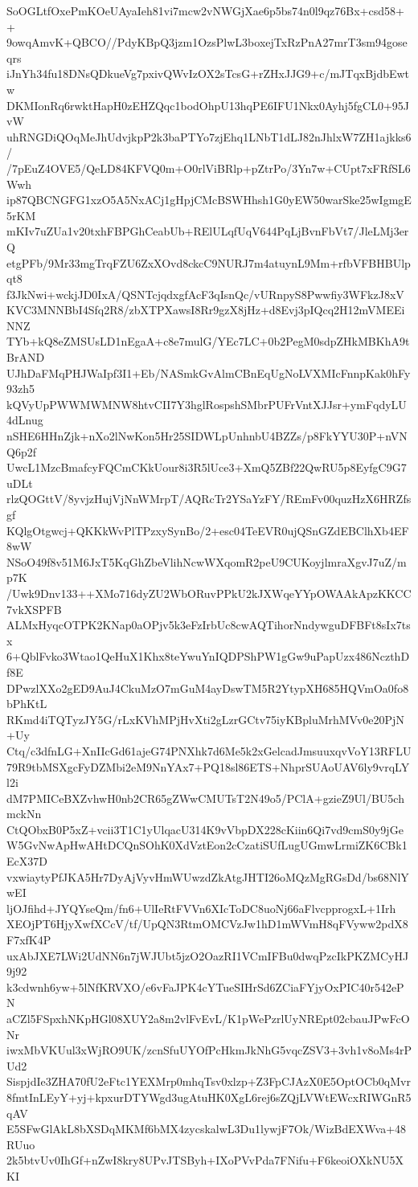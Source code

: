 SoOGLtfOxePmKOeUAyaIeh81vi7mcw2vNWGjXae6p5bs74n0l9qz76Bx+csd58++
9owqAmvK+QBCO//PdyKBpQ3jzm1OzsPlwL3boxejTxRzPnA27mrT3sm94goseqrs
iJnYh34fu18DNsQDkueVg7pxivQWvIzOX2sTcsG+rZHxJJG9+c/mJTqxBjdbEwtw
DKMIonRq6rwktHapH0zEHZQqc1bodOhpU13hqPE6IFU1Nkx0Ayhj5fgCL0+95JvW
uhRNGDiQOqMeJhUdvjkpP2k3baPTYo7zjEhq1LNbT1dLJ82nJhlxW7ZH1ajkks6/
/7pEuZ4OVE5/QeLD84KFVQ0m+O0rlViBRlp+pZtrPo/3Yn7w+CUpt7xFRfSL6Wwh
ip87QBCNGFG1xzO5A5NxACj1gHpjCMcBSWHhsh1G0yEW50warSke25wIgmgE5rKM
mKIv7uZUa1v20txhFBPGhCeabUb+RElULqfUqV644PqLjBvnFbVt7/JleLMj3erQ
etgPFb/9Mr33mgTrqFZU6ZxXOvd8ckcC9NURJ7m4atuynL9Mm+rfbVFBHBUlpqt8
f3JkNwi+wckjJD0IxA/QSNTcjqdxgfAcF3qIsnQc/vURnpyS8Pwwfiy3WFkzJ8xV
KVC3MNNBbI4Sfq2R8/zbXTPXawsI8Rr9gzX8jHz+d8Evj3pIQcq2H12mVMEEiNNZ
TYb+kQ8eZMSUsLD1nEgaA+c8e7mulG/YEc7LC+0b2PegM0sdpZHkMBKhA9tBrAND
UJhDaFMqPHJWaIpf3I1+Eb/NASmkGvAlmCBnEqUgNoLVXMIcFnnpKak0hFy93zh5
kQVyUpPWWMWMNW8htvCII7Y3hglRospshSMbrPUFrVntXJJsr+ymFqdyLU4dLnug
nSHE6HHnZjk+nXo2lNwKon5Hr25SIDWLpUnhnbU4BZZs/p8FkYYU30P+nVNQ6p2f
UwcL1MzcBmafcyFQCmCKkUour8i3R5lUce3+XmQ5ZBf22QwRU5p8EyfgC9G7uDLt
rlzQOGttV/8yvjzHujVjNnWMrpT/AQRcTr2YSaYzFY/REmFv00quzHzX6HRZfsgf
KQlgOtgwcj+QKKkWvPlTPzxySynBo/2+esc04TeEVR0ujQSnGZdEBClhXb4EF8wW
NSoO49f8v51M6JxT5KqGhZbeVlihNcwWXqomR2peU9CUKoyjlmraXgvJ7uZ/mp7K
/Uwk9Dnv133++XMo716dyZU2WbORuvPPkU2kJXWqeYYpOWAAkApzKKCC7vkXSPFB
ALMxHyqcOTPK2KNap0aOPjv5k3eFzIrbUc8cwAQTihorNndywguDFBFt8sIx7tsx
6+QblFvko3Wtao1QeHuX1Khx8teYwuYnIQDPShPW1gGw9uPapUzx486NczthDf8E
DPwzlXXo2gED9AuJ4CkuMzO7mGuM4ayDswTM5R2YtypXH685HQVmOa0fo8bPhKtL
RKmd4iTQTyzJY5G/rLxKVhMPjHvXti2gLzrGCtv75iyKBpluMrhMVv0e20PjN+Uy
Ctq/c3dfnLG+XnIIcGd61ajeG74PNXhk7d6Me5k2xGelcadJmsuuxqvVoY13RFLU
79R9tbMSXgcFyDZMbi2eM9NnYAx7+PQ18sl86ETS+NhprSUAoUAV6ly9vrqLYl2i
dM7PMICeBXZvhwH0nb2CR65gZWwCMUTsT2N49o5/PClA+gzieZ9Ul/BU5chmckNn
CtQObxB0P5xZ+vcii3T1C1yUlqacU314K9vVbpDX228cKiin6Qi7vd9cmS0y9jGe
W5GvNwApHwAHtDCQnSOhK0XdVztEon2cCzatiSUfLugUGmwLrmiZK6CBk1EcX37D
vxwiaytyPfJKA5Hr7DyAjVyvHmWUwzdZkAtgJHTI26oMQzMgRGsDd/bs68NlYwEI
ljOJfihd+JYQYseQm/fn6+UlIeRtFVVn6XIcToDC8uoNj66aFlvcpprogxL+1Irh
XEOjPT6HjyXwfXCcV/tf/UpQN3RtmOMCVzJw1hD1mWVmH8qFVyww2pdX8F7xfK4P
uxAbJXE7LWi2UdNN6n7jWJUbt5jzO2OazRI1VCmIFBu0dwqPzcIkPKZMCyHJ9j92
k3cdwnh6yw+5lNfKRVXO/e6vFaJPK4cYTueSIHrSd6ZCiaFYjyOxPIC40r542ePN
aCZl5FSpxhNKpHGl08XUY2a8m2vlFvEvL/K1pWePzrlUyNREpt02cbauJPwFcONr
iwxMbVKUul3xWjRO9UK/zcnSfuUYOfPcHkmJkNhG5vqcZSV3+3vh1v8oMs4rPUd2
SispjdIe3ZHA70fU2eFtc1YEXMrp0mhqTsv0xlzp+Z3FpCJAzX0E5OptOCb0qMvr
8fmtInLEyY+yj+kpxurDTYWgd3ugAtuHK0XgL6rej6sZQjLVWtEWcxRIWGnR5qAV
E5SFwGlAkL8bXSDqMKMf6bMX4zycskalwL3Du1lywjF7Ok/WizBdEXWva+48RUuo
2k5btvUv0IhGf+nZwI8kry8UPvJTSByh+IXoPVvPda7FNifu+F6keoiOXkNU5XKI
